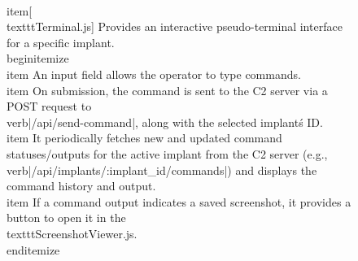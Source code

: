 \begin{description}
\begin{figure}[H]
    \\item[\\texttt{Terminal.js}] Provides an interactive pseudo-terminal interface for a specific implant.
        \\begin{itemize}
            \\item An input field allows the operator to type commands.
            \\item On submission, the command is sent to the C2 server via a POST request to \\verb|/api/send-command|, along with the selected implant\'s ID.
            \\item It periodically fetches new and updated command statuses/outputs for the active implant from the C2 server (e.g., \\verb|/api/implants/:implant_id/commands|) and displays the command history and output.
            \\item If a command output indicates a saved screenshot, it provides a button to open it in the \\texttt{ScreenshotViewer.js}.
        \\end{itemize}


\end{figure}
\end{description}
